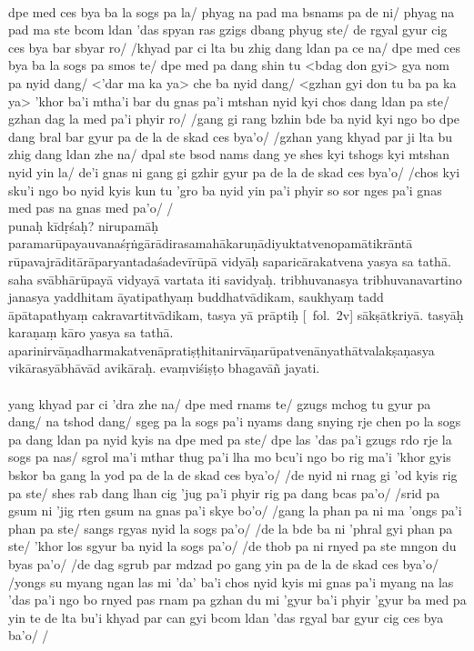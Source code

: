 \documentclass[12pt]{article}
\begin{document}
\textbf{\TVB}\\
dpe med ces bya ba la sogs pa la/ phyag na pad ma bsnams pa de ni/ phyag na pad ma ste bcom ldan 'das spyan ras gzigs dbang phyug ste/ de rgyal gyur cig ces bya bar sbyar ro/ /khyad par ci lta bu zhig dang ldan pa ce na/ dpe med ces bya ba la sogs pa smos te/ dpe med pa dang shin tu <bdag don gyi> gya nom pa nyid dang/ <'dar ma ka ya> che ba nyid dang/ <gzhan gyi don tu ba pa ka ya> 'khor ba'i mtha'i bar du gnas pa'i mtshan nyid kyi chos dang ldan pa ste/ gzhan dag la med pa'i phyir ro/ /gang gi rang bzhin bde ba nyid kyi ngo bo dpe dang bral bar gyur pa de la de skad ces bya'o/ /gzhan yang khyad par ji lta bu zhig dang ldan zhe na/ dpal ste bsod nams dang ye shes kyi tshogs kyi mtshan nyid yin la/ de'i gnas ni gang gi gzhir gyur pa de la de skad ces bya'o/ /chos kyi sku'i ngo bo nyid kyis kun tu 'gro ba nyid yin pa'i phyir so sor nges pa'i gnas med pas na gnas med pa'o/ /\\

punaḥ kīdṛśaḥ?
nirupamāḥ paramarūpayauvanaśṛṅgārādirasamahākaruṇādiyuktatvenopamātikrāntā rūpavajrāditārāparyantadaśadevīrūpā vidyāḥ saparicārakatvena yasya sa tathā.
saha svābhārūpayā vidyayā vartata iti savidyaḥ.
tribhuvanasya tribhuvanavartino janasya yaddhitam āyatipathyaṃ\footnoteB{
	āyatipathyaṃ] \emph{variant word division in} \EDD , āyati pathyaṃ; \emph{and in} \MS\, āyati pathyaṃ
} buddhatvādikam, saukhyaṃ tadd āpātapathyaṃ\footnoteB{
	āpātapathyaṃ] \conj\ (\TVA: 'phral gyi phan pa); āpayati pathyaṃ \MS\ \EDD ; de la bde ba ni bde ba ste \TVB
} cakravartitvādikam, tasya yā prāptiḥ [\MS\ fol.\ 2v] sākṣātkriyā.
tasyāḥ karaṇaṃ kāro yasya sa tathā.
aparinirvāṇadharmakatvenāpratiṣṭhitanirvāṇarūpatvenānyathātvalakṣaṇasya vikārasyābhāvād avikāraḥ.
evaṃviśiṣṭo bhagavāñ jayati.\\

\textbf{\TVA}\\
yang khyad par ci 'dra zhe na/ dpe med rnams te/ gzugs mchog tu gyur pa dang/ na tshod dang/ sgeg pa la sogs pa'i nyams dang snying rje chen po la sogs pa dang ldan pa nyid kyis na dpe med pa ste/ dpe las 'das pa'i gzugs rdo rje la sogs pa nas/ sgrol ma'i mthar thug pa'i lha mo bcu'i ngo bo rig ma'i 'khor gyis bskor ba gang la yod pa de la de skad ces bya'o/ /de nyid ni rnag gi 'od kyis rig pa ste/ shes rab dang lhan cig 'jug pa'i phyir rig pa dang bcas pa'o/ /srid pa gsum ni 'jig rten gsum na gnas pa'i skye bo'o/ /gang la phan pa ni ma 'ongs pa'i phan pa ste/ sangs rgyas nyid la sogs pa'o/ /de la bde ba ni 'phral gyi phan pa ste/ 'khor los sgyur ba nyid la sogs pa'o/ /de thob pa ni rnyed pa ste mngon du byas pa'o/ /de dag sgrub par mdzad po gang yin pa de la de skad ces bya'o/ /yongs su myang ngan las mi 'da' ba'i chos nyid kyis mi gnas pa'i myang na las 'das pa'i ngo bo rnyed pas rnam pa gzhan du mi 'gyur ba'i phyir 'gyur ba med pa yin te de lta bu'i khyad par can gyi bcom ldan 'das rgyal bar gyur cig ces bya ba'o/ /\\
\end{document}
